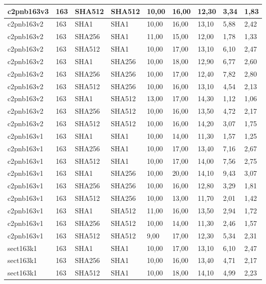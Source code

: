 \begin{longtable}{| l | l | l | l | l |l |l |l |l |}
c2pnb163v3 & 163 & SHA512 & SHA512 & 10,00 & 16,00 & 12,30 & 3,34 & 1,83 \\ \hline 
c2pnb163v2 & 163 & SHA1 & SHA1 & 10,00 & 16,00 & 13,10 & 5,88 & 2,42 \\ \hline 
c2pnb163v2 & 163 & SHA256 & SHA1 & 11,00 & 15,00 & 12,00 & 1,78 & 1,33 \\ \hline 
c2pnb163v2 & 163 & SHA512 & SHA1 & 10,00 & 17,00 & 13,10 & 6,10 & 2,47 \\ \hline 
c2pnb163v2 & 163 & SHA1 & SHA256 & 10,00 & 18,00 & 12,90 & 6,77 & 2,60 \\ \hline 
c2pnb163v2 & 163 & SHA256 & SHA256 & 10,00 & 17,00 & 12,40 & 7,82 & 2,80 \\ \hline 
c2pnb163v2 & 163 & SHA512 & SHA256 & 10,00 & 16,00 & 13,10 & 4,54 & 2,13 \\ \hline 
c2pnb163v2 & 163 & SHA1 & SHA512 & 13,00 & 17,00 & 14,30 & 1,12 & 1,06 \\ \hline 
c2pnb163v2 & 163 & SHA256 & SHA512 & 10,00 & 16,00 & 13,50 & 4,72 & 2,17 \\ \hline 
c2pnb163v2 & 163 & SHA512 & SHA512 & 10,00 & 16,00 & 14,20 & 3,07 & 1,75 \\ \hline 
c2pnb163v1 & 163 & SHA1 & SHA1 & 10,00 & 14,00 & 11,30 & 1,57 & 1,25 \\ \hline 
c2pnb163v1 & 163 & SHA256 & SHA1 & 10,00 & 17,00 & 13,40 & 7,16 & 2,67 \\ \hline 
c2pnb163v1 & 163 & SHA512 & SHA1 & 10,00 & 17,00 & 14,00 & 7,56 & 2,75 \\ \hline 
c2pnb163v1 & 163 & SHA1 & SHA256 & 10,00 & 20,00 & 14,10 & 9,43 & 3,07 \\ \hline 
c2pnb163v1 & 163 & SHA256 & SHA256 & 10,00 & 16,00 & 12,80 & 3,29 & 1,81 \\ \hline 
c2pnb163v1 & 163 & SHA512 & SHA256 & 10,00 & 13,00 & 11,70 & 2,01 & 1,42 \\ \hline 
c2pnb163v1 & 163 & SHA1 & SHA512 & 11,00 & 16,00 & 13,50 & 2,94 & 1,72 \\ \hline 
c2pnb163v1 & 163 & SHA256 & SHA512 & 10,00 & 14,00 & 11,30 & 2,46 & 1,57 \\ \hline 
c2pnb163v1 & 163 & SHA512 & SHA512 & 9,00 & 17,00 & 12,30 & 5,34 & 2,31 \\ \hline 
sect163k1 & 163 & SHA1 & SHA1 & 10,00 & 17,00 & 13,10 & 6,10 & 2,47 \\ \hline 
sect163k1 & 163 & SHA256 & SHA1 & 10,00 & 16,00 & 13,40 & 4,71 & 2,17 \\ \hline 
sect163k1 & 163 & SHA512 & SHA1 & 10,00 & 18,00 & 14,10 & 4,99 & 2,23 \\ \hline 

\end{longtable}
